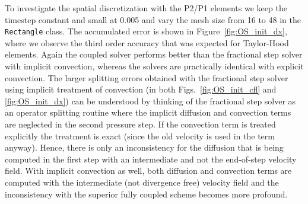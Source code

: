 To investigate the spatial discretization with the P2/P1 elements we keep the timestep constant and small at 0.005 and vary the mesh size from 16 to 48 in the {\fontsize{12pt}{12pt}\texttt{Rectangle}} class. The accumulated error is shown in Figure~\ref{fig:OS_init_dx}, where we observe the third order accuracy that was expected for Taylor-Hood elements. Again the coupled solver performs better than the fractional step solver with implicit convection, whereas the solvers are practically identical with explicit convection. The larger splitting errors obtained with the fractional step solver using implicit treatment of convection (in both Figs.~\ref{fig:OS_init_cfl} and \ref{fig:OS_init_dx}) can be understood by thinking of the fractional step solver as an operator splitting routine where the implicit diffusion and convection terms are neglected in the second pressure step. If the convection term is treated explicitly the treatment is exact (since the old velocity is used in the term anyway). Hence, there is only an inconsistency for the diffusion that is being computed in the first step with an intermediate and not the end-of-step velocity field. With implicit convection as well, both diffusion and convection terms are computed with the intermediate (not divergence free) velocity field and the inconsistency with the superior fully coupled scheme becomes more profound.

